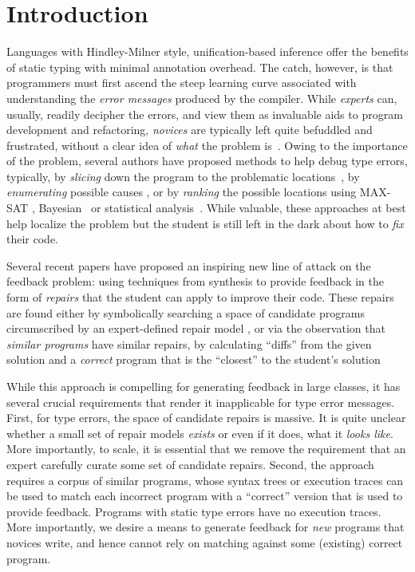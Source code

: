 \section{Introduction}
\label{sec:intro}

%
Languages with Hindley-Milner style, unification-based inference
offer the benefits of static typing with minimal annotation overhead.
The catch, however, is that programmers must first ascend the steep
learning curve associated with understanding the \emph{error messages}
produced by the compiler.
%
While \emph{experts} can, usually, readily decipher the errors, and
view them as invaluable aids to program development and refactoring,
\emph{novices} are typically left quite befuddled and frustrated,
without a clear idea of \emph{what} the problem is~\citep{Wand1986-nw}.
%
Owing to the importance of the problem, several authors have proposed methods to
help debug type errors, typically, by \emph{slicing} down the program to the
problematic locations~\citep{Haack2003-vc, Rahli2015-tt}, by \emph{enumerating}
possible causes \citep{Lerner2007-dt, Chen2014-gd}, or by \emph{ranking} the
possible locations using MAX-SAT
\citep{Pavlinovic2014-mr}, Bayesian~\citep{Zhang2014-lv}
or statistical analysis~\citep{Seidel:2017}.
%
While valuable, these approaches at best help localize
the problem but the student is still left in the dark
about how to \emph{fix} their code.

%
Several recent papers have proposed an inspiring new line of
attack on the feedback problem: using techniques from synthesis
to provide feedback in the form of \emph{repairs} that the student
can apply to improve their code.
%
These repairs are found either by symbolically searching a space of candidate
programs circumscribed by an expert-defined repair model
\citep{singh2013,HeadGSSFDH17}, or via the observation that \emph{similar
programs} have similar repairs, \ie by calculating ``diffs'' from the given
solution and a \emph{correct} program that is the ``closest'' to the student's
solution ~\citep{Gulwani_2018,Wang_2018}

While this approach is compelling for generating feedback in large
classes, it has several crucial requirements that render it inapplicable
for type error messages.
%
First, for type errors, the space of candidate repairs is massive.
It is quite unclear whether a small set of repair models \emph{exists}
or even if it does, what it \emph{looks like}. More importantly,
to scale, it is essential that we remove the requirement that an
expert carefully curate some set of candidate repairs.
%
Second, the approach requires a corpus of similar programs,
whose syntax trees or execution traces can be used to match
each incorrect program with a ``correct'' version that is
used to provide feedback. Programs with static type errors
have no execution traces.
%
More importantly, we desire a means to generate feedback
for \emph{new} programs that novices write, and hence
cannot rely on matching against some (existing) correct
program.

